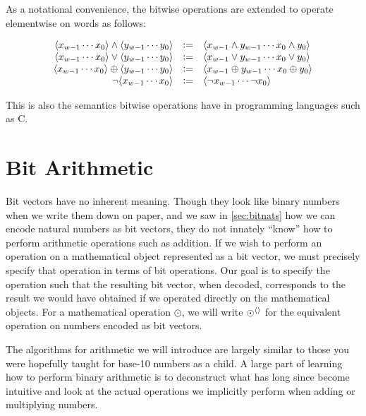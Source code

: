 As a notational convenience, the bitwise operations are extended to
operate elementwise on words as follows:

\begin{definition}
  \[
    \begin{array}{rcl}
      \langle x_{w-1}\cdots x_{0} \rangle \land \langle y_{w-1}\cdots y_{0} \rangle
      &\vcentcolon=& \langle x_{w-1} \land y_{w-1}\cdots x_{0} \land y_{0} \rangle \\
      \langle x_{w-1}\cdots x_{0} \rangle \lor \langle y_{w-1}\cdots y_{0} \rangle
      &\vcentcolon=& \langle x_{w-1} \lor y_{w-1} \cdots x_{0} \lor y_{0} \rangle \\
      \langle x_{w-1}\cdots x_{0} \rangle \oplus \langle y_{w-1}\cdots y_{0} \rangle
      &\vcentcolon=& \langle x_{w-1} \oplus y_{w-1}\cdots x_{0} \oplus y_{0} \rangle \\
      \neg \langle x_{w-1}\cdots x_{0} \rangle
      &\vcentcolon=& \langle \neg x_{w-1}\cdots \neg x_{0} \rangle
    \end{array}
  \]
  \label{def:wordbitwise}
\end{definition}

This is also the semantics bitwise operations have in programming
languages such as C.

\section{Bit Arithmetic}
\label{sec:bit-arithmetic}

Bit vectors have no inherent meaning.  Though they look like binary
numbers when we write them down on paper, and we saw in
\cref{sec:bitnats} how we can encode natural numbers as bit vectors,
they do not innately ``know'' how to perform arithmetic operations
such as addition.  If we wish to perform an operation on a
mathematical object represented as a bit vector, we must precisely
specify that operation in terms of bit operations.  Our goal is to
specify the operation such that the resulting bit vector, when
decoded, corresponds to the result we would have obtained if we
operated directly on the mathematical objects.  For a mathematical
operation $\odot$, we will write $\operatorname{\odot^{\langle\rangle}}$ for the equivalent
operation on numbers encoded as bit vectors.

The algorithms for arithmetic we will introduce are largely similar to
those you were hopefully taught for base-10 numbers as a child.  A
large part of learning how to perform binary arithmetic is to
deconstruct what has long since become intuitive and look at the
actual operations we implicitly perform when adding or multiplying
numbers.

